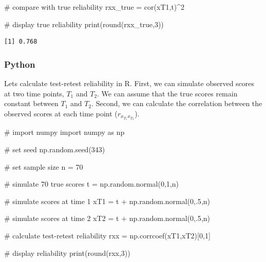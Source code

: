 \documentclass[
  letterpaper,
  DIV=11,
  numbers=noendperiod]{scrreprt}
\newenvironment{Shaded}{\begin{snugshade}}{\end{snugshade}}
\newcommand{\BuiltInTok}[1]{\textcolor[rgb]{0.00,0.23,0.31}{#1}}
\newcommand{\CommentTok}[1]{\textcolor[rgb]{0.37,0.37,0.37}{#1}}
\newcommand{\DecValTok}[1]{\textcolor[rgb]{0.68,0.00,0.00}{#1}}
\newcommand{\FloatTok}[1]{\textcolor[rgb]{0.68,0.00,0.00}{#1}}
\newcommand{\FunctionTok}[1]{\textcolor[rgb]{0.28,0.35,0.67}{#1}}
\newcommand{\ImportTok}[1]{\textcolor[rgb]{0.00,0.46,0.62}{#1}}
\newcommand{\NormalTok}[1]{\textcolor[rgb]{0.00,0.23,0.31}{#1}}
\newcommand{\OperatorTok}[1]{\textcolor[rgb]{0.37,0.37,0.37}{#1}}
\newcommand{\OtherTok}[1]{\textcolor[rgb]{0.00,0.23,0.31}{#1}}
\newcommand{\SpecialCharTok}[1]{\textcolor[rgb]{0.37,0.37,0.37}{#1}}
\begin{document}
\begin{Shaded}
\begin{Highlighting}[]
\CommentTok{\# compare with true reliability}
\NormalTok{rxx\_true }\OtherTok{=} \FunctionTok{cor}\NormalTok{(xT1,t)}\SpecialCharTok{\^{}}\DecValTok{2}

\CommentTok{\# display true reliability}
\FunctionTok{print}\NormalTok{(}\FunctionTok{round}\NormalTok{(rxx\_true,}\DecValTok{3}\NormalTok{))}
\end{Highlighting}
\end{Shaded}

\begin{verbatim}
[1] 0.768
\end{verbatim}

\subsubsection{Python}

Lets calculate test-retest reliability in R. First, we can simulate
observed scores at two time points, \(T_1\) and \(T_2\). We can assume
that the true scores remain constant between \(T_1\) and \(T_2\).
Second, we can calculate the correlation between the observed scores at
each time point (\(r_{x_{T_1}x_{T_2}}\)).

\begin{Shaded}
\begin{Highlighting}[]
\CommentTok{\# import numpy}
\ImportTok{import}\NormalTok{ numpy }\ImportTok{as}\NormalTok{ np}

\CommentTok{\# set seed}
\NormalTok{np.random.seed(}\DecValTok{343}\NormalTok{)}

\CommentTok{\# set sample size}
\NormalTok{n }\OperatorTok{=} \DecValTok{70}

\CommentTok{\# simulate 70 true scores}
\NormalTok{t }\OperatorTok{=}\NormalTok{ np.random.normal(}\DecValTok{0}\NormalTok{,}\DecValTok{1}\NormalTok{,n)}

\CommentTok{\# simulate scores at time 1}
\NormalTok{xT1 }\OperatorTok{=}\NormalTok{ t }\OperatorTok{+}\NormalTok{ np.random.normal(}\DecValTok{0}\NormalTok{,}\FloatTok{.5}\NormalTok{,n)}

\CommentTok{\# simulate scores at time 2}
\NormalTok{xT2 }\OperatorTok{=}\NormalTok{ t }\OperatorTok{+}\NormalTok{ np.random.normal(}\DecValTok{0}\NormalTok{,}\FloatTok{.5}\NormalTok{,n)}

\CommentTok{\# calculate test{-}retest reliability}
\NormalTok{rxx }\OperatorTok{=}\NormalTok{ np.corrcoef(xT1,xT2)[}\DecValTok{0}\NormalTok{,}\DecValTok{1}\NormalTok{]}

\CommentTok{\# display reliability}
\BuiltInTok{print}\NormalTok{(}\BuiltInTok{round}\NormalTok{(rxx,}\DecValTok{3}\NormalTok{))}
\end{Highlighting}
\end{Shaded}
\end{document}
